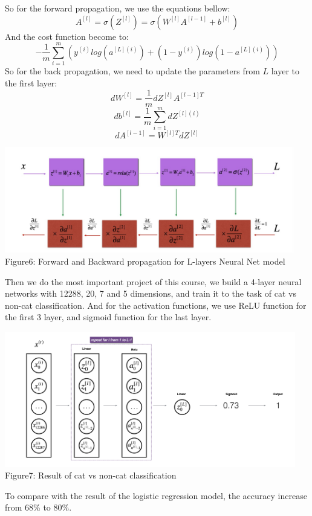 \documentclass[a4paper]{article}
\begin{document}
So for the forward propagation, we use the equations bellow:
$$A^{[l]}=\sigma(Z^{[l]})=\sigma(W^{[l]}A^{[l-1]}+b^{[l]})$$
And the cost function become to:
$$-\frac{1}{m}\sum_{i=1}^{m}(y^{(i)}log(a^{[L](i)})+(1-y^{(i)})log(1-a^{[L](i)}))$$
So for the back propagation, we need to update the parameters from $L$ layer to the first layer:
$$dW^{[l]}=\frac{1}{m}dZ^{[l]}A^{[l-1]T}$$
$$db^{[l]}=\frac{1}{m}\sum_{i=1}^mdZ^{[l](i)}$$
$$dA^{[l-1]}=W^{[l]T}dZ^{[l]}$$

\begin{center}
\includegraphics[width=5in]{LNNfb.png}\\
Figure6:  Forward and Backward propagation for L-layers Neural Net model
\end{center}

Then we do the most important project of this course, we build a 4-layer neural networks with 12288, 20, 7 and 5 dimensions, and train it to the task of cat vs non-cat classification. And for the activation functions, we use ReLU function for the first 3 layer, and sigmoid function for the last layer.

\begin{center}
\includegraphics[width=5in]{NNL.png}\\
Figure7: Result of cat vs non-cat classification
\end{center}

To compare with the result of the logistic regression model, the accuracy increase from 68\% to 80\%.
\end{document}
